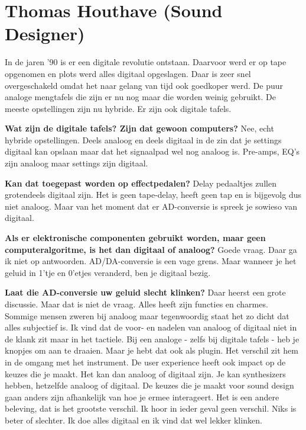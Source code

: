 \section{Thomas Houthave (Sound Designer)}
\label{trans:thomashouthave}

In de jaren '90 is er een digitale revolutie ontstaan. Daarvoor werd er op tape opgenomen en plots werd alles digitaal opgeslagen.\newline
Daar is zeer snel overgeschakeld omdat het naar gelang van tijd ook goedkoper werd. De puur analoge mengtafels die zijn er nu nog maar die worden weinig gebruikt.
De meeste opstellingen zijn nu hybride. Er zijn ook digitale tafels.

\textbf{Wat zijn de digitale tafels? Zijn dat gewoon computers?}\newline
Nee, echt hybride opstellingen. Deels analoog en deels digitaal in de zin dat je settings digitaal kan opslaan maar dat het signaalpad wel nog analoog is.
Pre-amps, EQ's zijn analoog maar settings zijn digitaal.

\textbf{Kan dat toegepast worden op effectpedalen?}\newline
Delay pedaaltjes zullen grotendeels digitaal zijn. Het is geen tape-delay, heeft geen tap en is bijgevolg dus niet analoog. Maar van het moment dat er AD-conversie is spreek je sowieso van digitaal.

\textbf{Als er elektronische componenten gebruikt worden, maar geen computeralgoritme, is het dan digitaal of analoog?}\newline
Goede vraag. Daar ga ik niet op antwoorden. AD/DA-conversie is een vage grens. Maar wanneer je het geluid in 1'tje en 0'etjes veranderd, ben je digitaal bezig.

\textbf{Laat die AD-conversie uw geluid slecht klinken?}\newline
Daar heerst een grote discussie. Maar dat is niet de vraag. Alles heeft zijn functies en charmes. Sommige mensen zweren bij analoog maar tegenwoordig staat het zo dicht dat alles subjectief is.
Ik vind dat de voor- en nadelen van analoog of digitaal niet in de klank zit maar in het tactiele. Bij een analoge - zelfs bij digitale tafels - heb je knopjes om aan te draaien.
Maar je hebt dat ook als plugin. Het verschil zit hem in de omgang met het instrument. De user experience heeft ook impact op de keuzes die je maakt.
Het kan dan analoog of digitaal zijn. Je kan synthesizers hebben, hetzelfde analoog of digitaal. De keuzes die je maakt voor sound design gaan anders zijn afhankelijk van hoe je ermee interageert.
Het is een andere beleving, dat is het grootste verschil. Ik hoor in ieder geval geen verschil. Niks is beter of slechter. Ik doe alles digitaal en ik vind dat wel lekker klinken.

